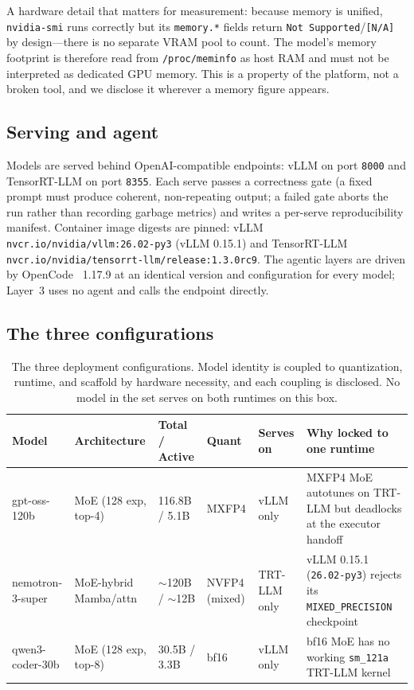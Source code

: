 \documentclass[10pt,twocolumn]{article}
\newcommand{\code}[1]{\texttt{\small #1}}
\begin{document}
A hardware detail that matters for measurement: because memory is unified, \code{nvidia-smi}
runs correctly but its \code{memory.*} fields return \code{Not Supported}/\code{[N/A]} by
design---there is no separate VRAM pool to count. The model's memory footprint is therefore
read from \code{/proc/meminfo} as host RAM and must not be interpreted as dedicated GPU
memory. This is a property of the platform, not a broken tool, and we disclose it wherever a
memory figure appears.

\subsection{Serving and agent}

Models are served behind OpenAI-compatible endpoints: vLLM on port \code{8000} and
TensorRT-LLM on port \code{8355}. Each serve passes a correctness gate (a fixed prompt must
produce coherent, non-repeating output; a failed gate aborts the run rather than recording
garbage metrics) and writes a per-serve reproducibility manifest. Container image digests
are pinned: vLLM \code{nvcr.io/nvidia/vllm:26.02-py3} (vLLM 0.15.1) and TensorRT-LLM
\code{nvcr.io/nvidia/tensorrt-llm/release:1.3.0rc9}. The agentic layers are driven by
OpenCode~\cite{opencode} 1.17.9 at an identical version and configuration for every model;
Layer~3 uses no agent
and calls the endpoint directly.

\subsection{The three configurations}

\begin{table}[t]
\centering
\caption{The three deployment configurations. Model identity is coupled to quantization,
runtime, and scaffold by hardware necessity, and each coupling is disclosed. No model in the
set serves on both runtimes on this box.}
\label{tab:configs}
\small
\setlength{\tabcolsep}{4pt}
\begin{tabular}{@{}L{0.13\textwidth}L{0.16\textwidth}L{0.11\textwidth}L{0.10\textwidth}L{0.09\textwidth}L{0.30\textwidth}@{}}
\toprule
Model & Architecture & Total / Active & Quant & Serves on & Why locked to one runtime \\
\midrule
gpt-oss-120b & MoE (128 exp, top-4) & 116.8B / 5.1B & MXFP4 & vLLM only &
  MXFP4 MoE autotunes on TRT-LLM but deadlocks at the executor handoff \\
nemotron-3-super & MoE-hybrid Mamba/attn & ${\sim}$120B / ${\sim}$12B & NVFP4 (mixed) & TRT-LLM only &
  vLLM 0.15.1 (\code{26.02-py3}) rejects its \code{MIXED\_PRECISION} checkpoint \\
qwen3-coder-30b & MoE (128 exp, top-8) & 30.5B / 3.3B & bf16 & vLLM only &
  bf16 MoE has no working \code{sm\_121a} TRT-LLM kernel \\
\bottomrule
\end{tabular}
\end{table}
\end{document}
